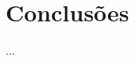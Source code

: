\documentclass[12pt]{article}
\begin{document}
\section{Conclusões}
	...
%
%
%
%
%
%
%
\end{document}
